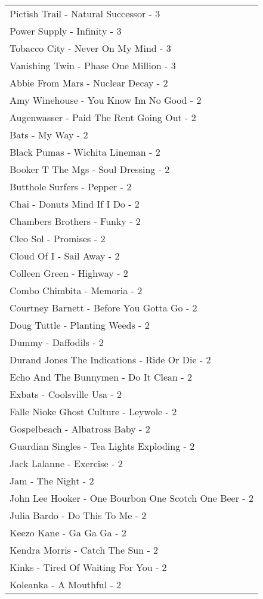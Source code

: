 \documentclass[
]{article}
\begin{document}
\begin{longtable}{l}
Pictish Trail - Natural Successor - 3 \\ 
Power Supply - Infinity - 3 \\ 
Tobacco City - Never On My Mind - 3 \\ 
Vanishing Twin - Phase One Million - 3 \\ 
Abbie From Mars - Nuclear Decay - 2 \\ 
Amy Winehouse - You Know Im No Good - 2 \\ 
Augenwasser - Paid The Rent Going Out - 2 \\ 
Bats - My Way - 2 \\ 
Black Pumas - Wichita Lineman - 2 \\ 
Booker T The Mgs - Soul Dressing - 2 \\ 
Butthole Surfers - Pepper - 2 \\ 
Chai - Donuts Mind If I Do - 2 \\ 
Chambers Brothers - Funky - 2 \\ 
Cleo Sol - Promises - 2 \\ 
Cloud Of I - Sail Away - 2 \\ 
Colleen Green - Highway - 2 \\ 
Combo Chimbita - Memoria - 2 \\ 
Courtney Barnett - Before You Gotta Go - 2 \\ 
Doug Tuttle - Planting Weeds - 2 \\ 
Dummy - Daffodils - 2 \\ 
Durand Jones The Indications - Ride Or Die - 2 \\ 
Echo And The Bunnymen - Do It Clean - 2 \\ 
Exbats - Coolsville Usa - 2 \\ 
Falle Nioke Ghost Culture - Leywole - 2 \\ 
Gospelbeach - Albatross Baby - 2 \\ 
Guardian Singles - Tea Lights Exploding - 2 \\ 
Jack Lalanne - Exercise - 2 \\ 
Jam - The Night - 2 \\ 
John Lee Hooker - One Bourbon One Scotch One Beer - 2 \\ 
Julia Bardo - Do This To Me - 2 \\ 
Keezo Kane - Ga Ga Ga - 2 \\ 
Kendra Morris - Catch The Sun - 2 \\ 
Kinks - Tired Of Waiting For You - 2 \\ 
Koleanka - A Mouthful - 2 \\ 

\end{longtable}
\end{document}

